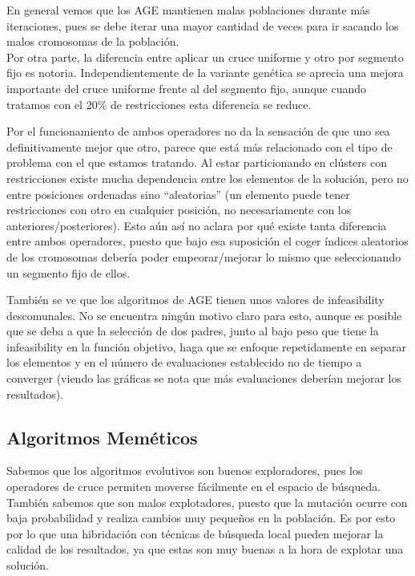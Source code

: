 En general vemos que los AGE mantienen malas poblaciones durante más iteraciones, pues se debe iterar una mayor cantidad de veces para ir sacando los malos cromosomas de la población. \\

Por otra parte, la diferencia entre aplicar un cruce uniforme y otro por segmento fijo es notoria. Independientemente de la variante genética se aprecia una mejora importante del cruce uniforme frente al del segmento fijo, aunque cuando tratamos con el 20\% de restricciones esta diferencia se reduce.

Por el funcionamiento de ambos operadores no da la sensación de que uno sea definitivamente mejor que otro, parece que está más relacionado con el tipo de problema con el que estamos tratando. Al estar particionando en clústers con restricciones existe mucha dependencia entre los elementos de la solución, pero no entre posiciones ordenadas sino ``aleatorias'' (un elemento puede tener restricciones con otro en cualquier posición, no necesariamente con los anteriores/posteriores). Esto aún así no aclara por qué existe tanta diferencia entre ambos operadores, puesto que bajo esa suposición el coger índices aleatorios de los cromosomas debería poder empeorar/mejorar lo mismo que seleccionando un segmento fijo de ellos.

También se ve que los algoritmos de AGE tienen unos valores de infeasibility descomunales. No se encuentra ningún motivo claro para esto, aunque es posible que se deba a que la selección de dos padres, junto al bajo peso que tiene la infeasibility en la función objetivo, haga que se enfoque repetidamente en separar los elementos y en el número de evaluaciones establecido no de tiempo a converger (viendo las gráficas se nota que más evaluaciones deberían mejorar los resultados).

\subsection{Algoritmos Meméticos}

Sabemos que los algoritmos evolutivos son buenos exploradores, pues los operadores de cruce permiten moverse fácilmente en el espacio de búsqueda. También sabemos que son malos explotadores, puesto que la mutación ocurre con baja probabilidad y realiza cambios muy pequeños en la población. Es por esto por lo que una hibridación con técnicas de búsqueda local pueden mejorar la calidad de los resultados, ya que estas son muy buenas a la hora de explotar una solución.

